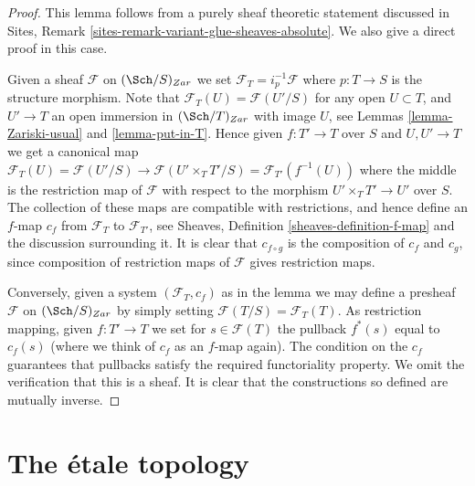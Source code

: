 \begin{proof}
This lemma follows from a purely sheaf theoretic statement discussed
in Sites, Remark \ref{sites-remark-variant-glue-sheaves-absolute}.
We also give a direct proof in this case.

\medskip\noindent
Given a sheaf $\mathcal{F}$ on $(\Sch/S)_{Zar}$
we set $\mathcal{F}_T = i_p^{-1}\mathcal{F}$ where $p : T \to S$
is the structure morphism. Note that
$\mathcal{F}_T(U) = \mathcal{F}(U'/S)$ for any open $U \subset T$,
and $U' \to T$ an open immersion in $(\Sch/T)_{Zar}$
with image $U$, see Lemmas \ref{lemma-Zariski-usual} and \ref{lemma-put-in-T}.
Hence given $f : T' \to T$ over $S$ and $U, U' \to T$ we get a canonical
map $\mathcal{F}_T(U) = \mathcal{F}(U'/S) \to \mathcal{F}(U'\times_T T'/S)
= \mathcal{F}_{T'}(f^{-1}(U))$ where the middle is the restriction map
of $\mathcal{F}$ with respect to the morphism
$U' \times_T T' \to U'$ over $S$. The collection of these maps are
compatible with restrictions, and hence define an $f$-map $c_f$
from $\mathcal{F}_T$ to $\mathcal{F}_{T'}$, see
Sheaves, Definition \ref{sheaves-definition-f-map} and the discussion
surrounding it. It is clear that $c_{f \circ g}$ is the composition of
$c_f$ and $c_g$, since composition of restriction maps of $\mathcal{F}$
gives restriction maps.

\medskip\noindent
Conversely, given a system $(\mathcal{F}_T, c_f)$ as in the lemma
we may define a presheaf $\mathcal{F}$ on $(\Sch/S)_{Zar}$
by simply setting $\mathcal{F}(T/S) = \mathcal{F}_T(T)$. As restriction
mapping, given $f : T' \to T$ we set for $s \in \mathcal{F}(T)$
the pullback $f^*(s)$ equal to $c_f(s)$ (where we think of $c_f$ as
an $f$-map again). The condition on the $c_f$ guarantees that
pullbacks satisfy the required functoriality property.
We omit the verification that this is a sheaf.
It is clear that the constructions so defined are mutually inverse.
\end{proof}























\section{The \'etale topology}
\label{section-etale}

